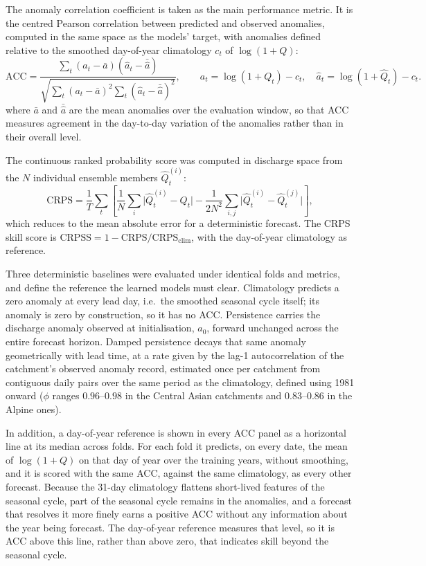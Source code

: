\documentclass[review,12pt,authoryear]{elsarticle}
\begin{document}
The anomaly correlation coefficient \citep[ACC;][]{jolliffe2012} is taken as the main performance metric. It is the centred Pearson correlation between predicted and observed anomalies, computed in the same space as the models' target, with anomalies defined relative to the smoothed day-of-year climatology $c_t$ of $\log(1+Q)$:
\begin{equation}
\mathrm{ACC} = \frac{\sum_t (a_t - \bar{a})(\hat{a}_t - \bar{\hat{a}})}{\sqrt{\sum_t (a_t - \bar{a})^2 \sum_t (\hat{a}_t - \bar{\hat{a}})^2}}, \qquad
a_t = \log(1+Q_t) - c_t, \quad \hat{a}_t = \log(1+\hat{Q}_t) - c_t.
\end{equation}
where $\bar{a}$ and $\bar{\hat{a}}$ are the mean anomalies over the evaluation window, so that ACC measures agreement in the day-to-day variation of the anomalies rather than in their overall level.


The continuous ranked probability score \citep[CRPS;][]{hersbach2000} was computed in discharge space from the $N$ individual ensemble members $\hat{Q}_t^{(i)}$:
\begin{equation}
\mathrm{CRPS} = \frac{1}{T}\sum_t \left[ \frac{1}{N}\sum_{i} \bigl|\hat{Q}_t^{(i)} - Q_t\bigr| - \frac{1}{2N^2}\sum_{i,j} \bigl|\hat{Q}_t^{(i)} - \hat{Q}_t^{(j)}\bigr| \right],
\end{equation}
which reduces to the mean absolute error for a deterministic forecast. The CRPS skill score is $\mathrm{CRPSS} = 1 - \mathrm{CRPS}/\mathrm{CRPS}_{\mathrm{clim}}$, with the day-of-year climatology as reference.

Three deterministic baselines were evaluated under identical folds and metrics, and define the reference the learned models must clear. Climatology predicts a zero anomaly at every lead day, i.e.\ the smoothed seasonal cycle itself; its anomaly is zero by construction, so it has no ACC. Persistence carries the discharge anomaly observed at initialisation, $a_{0}$, forward unchanged across the entire forecast horizon. Damped persistence decays that same anomaly geometrically with lead time, at a rate given by the lag-1 autocorrelation of the catchment's observed anomaly record, estimated once per catchment from contiguous daily pairs over the same period as the climatology, defined using 1981 onward ($\phi$ ranges $0.96$--$0.98$ in the Central Asian catchments and $0.83$--$0.86$ in the Alpine ones).

In addition, a day-of-year reference is shown in every ACC panel as a horizontal line at its median across folds. For each fold it predicts, on every date, the mean of $\log(1+Q)$ on that day of year over the training years, without smoothing, and it is scored with the same ACC, against the same climatology, as every other forecast. Because the 31-day climatology flattens short-lived features of the seasonal cycle, part of the seasonal cycle remains in the anomalies, and a forecast that resolves it more finely earns a positive ACC without any information about the year being forecast. The day-of-year reference measures that level, so it is ACC above this line, rather than above zero, that indicates skill beyond the seasonal cycle.
\end{document}

